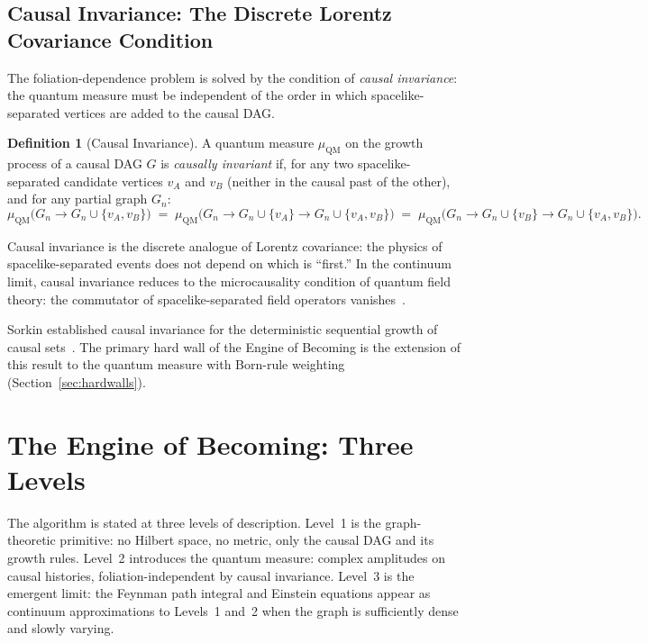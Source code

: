 \documentclass[11pt,a4paper]{article}
\theoremstyle{plain}
\theoremstyle{definition}
\newtheorem{definition}[theorem]{Definition}
\theoremstyle{remark}
\newcommand{\muC}{\mu_{\mathrm{QM}}}   %
\begin{document}
\subsection{Causal Invariance: The Discrete Lorentz Covariance Condition}

The foliation-dependence problem is solved by the condition of \emph{causal
invariance}: the quantum measure must be independent of the order in which
spacelike-separated vertices are added to the causal DAG.

\begin{definition}[Causal Invariance]
A quantum measure $\muC$ on the growth process of a causal DAG $G$ is
\emph{causally invariant} if, for any two spacelike-separated candidate
vertices $v_A$ and $v_B$ (neither in the causal past of the other), and
for any partial graph $G_n$:
\begin{equation}
  \muC\bigl(G_n \to G_n \cup \{v_A, v_B\}\bigr)
  \;=\;
  \muC\bigl(G_n \to G_n \cup \{v_A\} \to G_n \cup \{v_A, v_B\}\bigr)
  \;=\;
  \muC\bigl(G_n \to G_n \cup \{v_B\} \to G_n \cup \{v_A, v_B\}\bigr).
  \label{eq:causal_invariance}
\end{equation}
\end{definition}

Causal invariance is the discrete analogue of Lorentz covariance: the physics
of spacelike-separated events does not depend on which is ``first.'' In the
continuum limit, causal invariance reduces to the microcausality condition of
quantum field theory: the commutator of spacelike-separated field operators
vanishes~\citep{Haag1996}.

Sorkin established causal invariance for the deterministic sequential growth
of causal sets~\citep{RideoutSorkin2000}. The primary hard wall of the Engine
of Becoming is the extension of this result to the quantum measure with
Born-rule weighting (Section~\ref{sec:hardwalls}).

\section{The Engine of Becoming: Three Levels}
\label{sec:algorithm}

The algorithm is stated at three levels of description. Level~1 is the
graph-theoretic primitive: no Hilbert space, no metric, only the causal DAG
and its growth rules. Level~2 introduces the quantum measure: complex amplitudes
on causal histories, foliation-independent by causal invariance. Level~3 is
the emergent limit: the Feynman path integral and Einstein equations appear
as continuum approximations to Levels~1 and~2 when the graph is sufficiently
dense and slowly varying.
\end{document}

